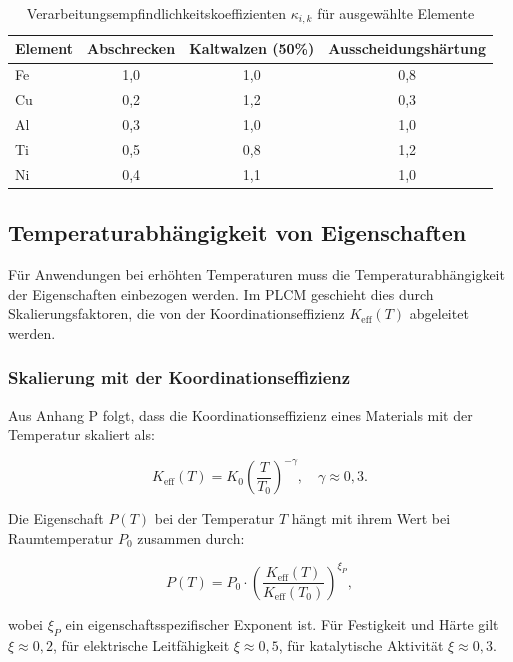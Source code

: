 \documentclass[12pt,a4paper]{article}
\newcommand{\Keff}{K_{\mathrm{eff}}}
\begin{document}
\begin{table}[htbp]
	\centering
	\caption{Verarbeitungsempfindlichkeitskoeffizienten \(\kappa_{i,k}\) für ausgewählte Elemente}
	\label{tab:kappa-proc}
	\begin{tabular}{lccc}
		\toprule
		Element & Abschrecken & Kaltwalzen (50\%) & Ausscheidungshärtung \\
		\midrule
		Fe & 1,0 & 1,0 & 0,8 \\
		Cu & 0,2 & 1,2 & 0,3 \\
		Al & 0,3 & 1,0 & 1,0 \\
		Ti & 0,5 & 0,8 & 1,2 \\
		Ni & 0,4 & 1,1 & 1,0 \\
		\bottomrule
	\end{tabular}
\end{table}

\subsection{Temperaturabhängigkeit von Eigenschaften}
\label{subsec:temperature-dependence}

Für Anwendungen bei erhöhten Temperaturen muss die Temperaturabhängigkeit der Eigenschaften einbezogen werden. Im PLCM geschieht dies durch Skalierungsfaktoren, die von der Koordinationseffizienz \(\Keff(T)\) abgeleitet werden.

\subsubsection{Skalierung mit der Koordinationseffizienz}

Aus Anhang P folgt, dass die Koordinationseffizienz eines Materials mit der Temperatur skaliert als:

\begin{equation}
	\Keff(T) = K_0 \left( \frac{T}{T_0} \right)^{-\gamma}, \quad \gamma \approx 0,3.
	\label{eq:keff-T}
\end{equation}

Die Eigenschaft \(P(T)\) bei der Temperatur \(T\) hängt mit ihrem Wert bei Raumtemperatur \(P_0\) zusammen durch:

\begin{equation}
	P(T) = P_0 \cdot \left( \frac{\Keff(T)}{\Keff(T_0)} \right)^{\xi_P},
	\label{eq:property-T-scaling}
\end{equation}

wobei \(\xi_P\) ein eigenschaftsspezifischer Exponent ist. Für Festigkeit und Härte gilt \(\xi \approx 0,2\), für elektrische Leitfähigkeit \(\xi \approx 0,5\), für katalytische Aktivität \(\xi \approx 0,3\).
\end{document}

